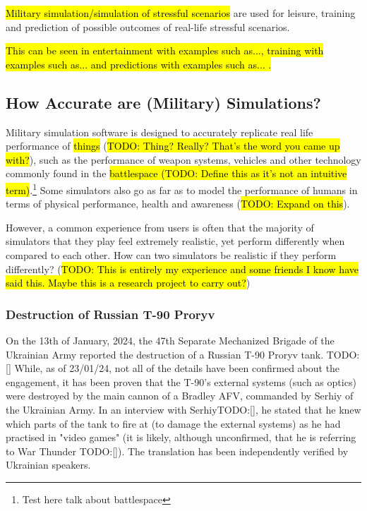 \documentclass{article}
\begin{document}
\hl{Military simulation/simulation of stressful scenarios} are used for leisure, training and prediction of possible outcomes of real-life stressful scenarios.

\hl{This can be seen in entertainment with examples such as..., training with examples such as... and predictions with examples such as... .}

\subsection{How Accurate are (Military) Simulations?}

Military simulation software is designed to accurately replicate real life performance of \hl{things} (\hl{TODO: Thing? Really? That's the word you came up with?}), such as the performance of weapon systems, vehicles and other technology commonly found in the \hl{battlespace (TODO: Define this as it's not an intuitive term)}.\footnote{Test here talk about battlespace} Some simulators also go as far as to model the performance of humans in terms of physical performance, health and awareness (\hl{TODO: Expand on this}).

However, a common experience from users is often that the majority of simulators that they play feel extremely realistic, yet perform differently when compared to each other. How can two simulators be realistic if they perform differently? (\hl{TODO: This is entirely my experience and some friends I know have said this. Maybe this is a research project to carry out?})

\subsubsection{Destruction of Russian T-90 Proryv}

On the 13th of January, 2024, the 47th Separate Mechanized Brigade of the Ukrainian Army reported the destruction of a Russian T-90 Proryv tank. TODO: [] While, as of 23/01/24, not all of the details have been confirmed about the engagement, it has been proven that the T-90's external systems (such as optics) were destroyed by the main cannon of a Bradley AFV, commanded by Serhiy of the Ukrainian Army. In an interview with SerhiyTODO:[], he stated that he knew which parts of the tank to fire at (to damage the external systems) as he had practised in "video games" (it is likely, although unconfirmed, that he is referring to War Thunder TODO:[]). The translation has been independently verified by Ukrainian speakers.
\end{document}
